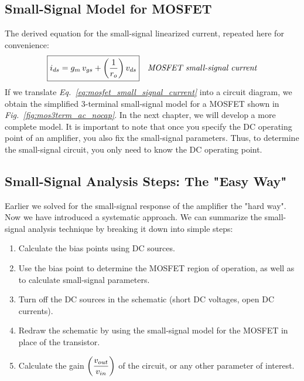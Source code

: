 \subsection{Small-Signal Model for MOSFET}
The derived equation for the small-signal linearized current, repeated here for convenience:
    \begin{align}
        \Aboxed{i_{ds} &= g_m\,v_{gs} + \left( \frac{1}{r_o} \right) v_{ds}} &\textit{MOSFET small-signal current}
        \label{eq:mosfet_small_signal_current}
    \end{align}
If we translate \emph{Eq.~\ref{eq:mosfet_small_signal_current}} into a circuit diagram, we obtain the simplified  3-terminal small-signal model for a MOSFET shown in \emph{Fig.~\ref{fig:mos3term_ac_nocap}}.  In the next chapter, we will develop a more complete model.  It is important to note that once you specify the DC operating point of an amplifier, you also fix the small-signal parameters.  Thus, to determine the small-signal circuit, you only need to know the DC operating point.
\subsection{Small-Signal Analysis Steps:  The "Easy Way"}
Earlier we solved for the small-signal response of the amplifier the "hard way".  Now we have introduced a systematic approach.  We can summarize the small-signal analysis technique by breaking it down into simple steps:
\vspace{0.45cm}
    \begin{enumerate}
    	\item{Calculate the bias points using DC sources.}
    	\vspace{0.25cm}
    	\item{Use the bias point to determine the MOSFET region of operation, as well as to calculate small-signal parameters.}
    	\vspace{0.25cm}
    	\item{Turn off the DC sources in the schematic (short DC voltages, open DC currents).}
    	\vspace{0.25cm}
    	\item{Redraw the schematic by using the small-signal model for the MOSFET in place of the transistor.}
    	\vspace{0.25cm}
    	\item{Calculate the gain $\left(\mathlarger{\frac{v_{out}}{v_{in}}}\right)$ of the circuit, or any other parameter of interest.}
    \end{enumerate}
